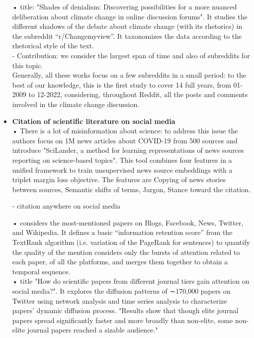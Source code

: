 \begin{itemize}
• \cite{cagle2019shades} title: "Shades of denialism: Discovering possibilities for a more nuanced deliberation about climate change in online discussion forums".  It studies the different shadows of the debate about climate change (with its rhetorics) in the subreddit “r/Changemyview”. It taxonomizes the data according to the rhetorical style of the text.\\




- Contribution: we consider the largest span of time and also of subreddits for this topic.\\
Generally, all these works focus on a few subreddits in a small period: to the best of our knowledge, this is the first study to cover 14 full years, from 01-2009 to 12-2022, considering, throughout Reddit, all the posts and comments involved in the climate change discussion. \\



\item \textbf{Citation of scientific literature on social media}\\

• \cite{gruppi2023scilander} There is a lot of misinformation about science: to address this issue the authors focus on 1M news articles about COVID-19 from 500 sources and introduce "SciLander, a method for learning representations of news sources reporting on science-based topics". This tool combines four features in a unified framework to train unsupervised news source embeddings with a triplet margin loss objective. The features are Copying of news stories between sources, Semantic shifts of terms, Jargon, Stance toward the citation.


- citation anywhere on social media

• \cite{hwang2023information} considers the most-mentioned papers on Blogs, Facebook, News, Twitter, and Wikipedia. It defines a basic “information retention score” from the TextRank algorithm (i.e. variation of the PageRank for sentences) to quantify the quality of the mention considers only the bursts of attention related to each paper, of all the platforms, and merges them together to obtain a temporal sequence. \\

• \cite{cao2023scientific} title "How do scientific papers from different journal tiers gain attention on social media?". It explores the diffusion patterns of ∼170,000 papers on Twitter using network analysis and time series analysis to characterize papers’ dynamic diffusion process. "Results show that though elite journal papers spread significantly faster and more broadly than non-elite, some non-elite journal papers reached a sizable audience."\\


\end{itemize}
